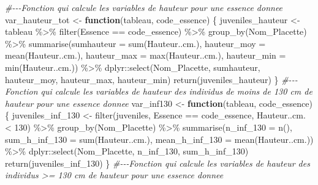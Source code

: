 \documentclass[
  12pt,
  american,
  a4paper,
  extrafontsizes,onecolumn,openright
  ]{memoir}
\newenvironment{Shaded}{\begin{snugshade}}{\end{snugshade}}
\newcommand{\AttributeTok}[1]{\textcolor[rgb]{0.77,0.63,0.00}{#1}}
\newcommand{\CommentTok}[1]{\textcolor[rgb]{0.56,0.35,0.01}{\textit{#1}}}
\newcommand{\ControlFlowTok}[1]{\textcolor[rgb]{0.13,0.29,0.53}{\textbf{#1}}}
\newcommand{\DecValTok}[1]{\textcolor[rgb]{0.00,0.00,0.81}{#1}}
\newcommand{\FunctionTok}[1]{\textcolor[rgb]{0.00,0.00,0.00}{#1}}
\newcommand{\NormalTok}[1]{#1}
\newcommand{\OtherTok}[1]{\textcolor[rgb]{0.56,0.35,0.01}{#1}}
\newcommand{\SpecialCharTok}[1]{\textcolor[rgb]{0.00,0.00,0.00}{#1}}
\begin{document}
\normalsize

\scriptsize

\begin{Shaded}
\begin{Highlighting}[]
\CommentTok{\#{-}{-}{-}Fonction qui calcule les variables de hauteur pour une essence donnee}
\NormalTok{var\_hauteur\_tot }\OtherTok{\textless{}{-}} \ControlFlowTok{function}\NormalTok{(tableau, code\_essence) \{}
\NormalTok{    juveniles\_hauteur }\OtherTok{\textless{}{-}}\NormalTok{ tableau }\SpecialCharTok{\%\textgreater{}\%}
        \FunctionTok{filter}\NormalTok{(Essence }\SpecialCharTok{==}\NormalTok{ code\_essence) }\SpecialCharTok{\%\textgreater{}\%}
        \FunctionTok{group\_by}\NormalTok{(Nom\_Placette) }\SpecialCharTok{\%\textgreater{}\%}
        \FunctionTok{summarise}\NormalTok{(}\AttributeTok{sumhauteur =} \FunctionTok{sum}\NormalTok{(Hauteur..cm.), }\AttributeTok{hauteur\_moy =} \FunctionTok{mean}\NormalTok{(Hauteur..cm.),}
            \AttributeTok{hauteur\_max =} \FunctionTok{max}\NormalTok{(Hauteur..cm.), }\AttributeTok{hauteur\_min =} \FunctionTok{min}\NormalTok{(Hauteur..cm.)) }\SpecialCharTok{\%\textgreater{}\%}
\NormalTok{        dplyr}\SpecialCharTok{::}\FunctionTok{select}\NormalTok{(Nom\_Placette, sumhauteur, hauteur\_moy,}
\NormalTok{            hauteur\_max, hauteur\_min)}
    \FunctionTok{return}\NormalTok{(juveniles\_hauteur)}
\NormalTok{\}}
\CommentTok{\#{-}{-}{-}Fonction qui calcule les variables de hauteur des individus de moins de 130 cm de hauteur pour une essence donnee}
\NormalTok{var\_inf130 }\OtherTok{\textless{}{-}} \ControlFlowTok{function}\NormalTok{(tableau, code\_essence) \{}
\NormalTok{    juveniles\_inf\_130 }\OtherTok{\textless{}{-}} \FunctionTok{filter}\NormalTok{(juveniles, Essence }\SpecialCharTok{==}\NormalTok{ code\_essence,}
\NormalTok{        Hauteur..cm. }\SpecialCharTok{\textless{}} \DecValTok{130}\NormalTok{) }\SpecialCharTok{\%\textgreater{}\%}
        \FunctionTok{group\_by}\NormalTok{(Nom\_Placette) }\SpecialCharTok{\%\textgreater{}\%}
        \FunctionTok{summarise}\NormalTok{(}\AttributeTok{n\_inf\_130 =} \FunctionTok{n}\NormalTok{(), }\AttributeTok{sum\_h\_inf\_130 =} \FunctionTok{sum}\NormalTok{(Hauteur..cm.),}
            \AttributeTok{mean\_h\_inf\_130 =} \FunctionTok{mean}\NormalTok{(Hauteur..cm.)) }\SpecialCharTok{\%\textgreater{}\%}
\NormalTok{        dplyr}\SpecialCharTok{::}\FunctionTok{select}\NormalTok{(Nom\_Placette, n\_inf\_130, sum\_h\_inf\_130)}
    \FunctionTok{return}\NormalTok{(juveniles\_inf\_130)}
\NormalTok{\}}
\CommentTok{\#{-}{-}{-}Fonction qui calcule les variables de hauteur des individus \textgreater{}= 130 cm de hauteur pour une essence donnee}

\end{Highlighting}
\end{Shaded}
\end{document}
